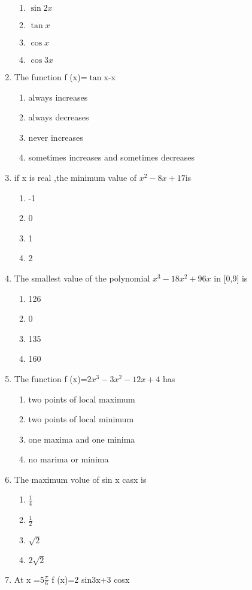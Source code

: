 \documentclass[12pt]{article}
\begin{document}
\begin{enumerate}
\begin{enumerate}
\item $\sin2x$
\item $\tan x$
\item $\cos x$
\item $\cos3x$
\end{enumerate}
\item The function f (x)=$\tan$x-x
\begin{enumerate}
\item always increases 
\item always decreases
\item never increases 
\item sometimes increases and sometimes decreases
\end{enumerate}
\item if x is real ,the minimum value of $x^2-8x+17$is
\begin{enumerate}
\item -1
\item 0
\item 1
\item 2
\end{enumerate}
\item The smallest value of the polynomial $x^3-18x^2+96x$ in [0,9] is
\begin{enumerate}
\item 126
\item 0
\item 135 
\item 160
\end{enumerate}
\item The function f (x)=$2x^3-3x^2-12x+4$ has
\begin{enumerate} 
\item two points of local maximum
\item two points of local minimum
\item one maxima and one minima
\item no marima or minima
\end{enumerate}
\item The maximum volue of sin x casx is 
\begin{enumerate} 
\item $\frac{1}{4}$
\item $\frac{1}{2}$
\item $\sqrt{2}$
\item $2\sqrt{2}$
\end{enumerate}
\item At x =5$\frac{\pi}{6}$ f (x)=2 sin3x+3 cosx
\begin{enumerate} 

\end{enumerate}
\end{enumerate}
\end{document}

